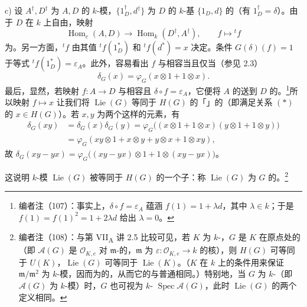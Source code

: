 c) 设 $A^\dagger,D^\dagger$ 为 $A,D$ 的 $k$-模，$\{1_D^\dagger,d^\dagger\}$ 为 $D$ 的 $k$-基 $\{1_D,d\}$ 的（有 $1_D^\dagger=\delta$）。由于 $D$ 在 $k$ 上自由，映射
\[
\operatorname{Hom}_c(A,D)\longrightarrow\operatorname{Hom}_k(D^\dagger,A^\dagger),\qquad f\longmapsto{}^tf
\]
为。另一方面，${}^tf$ 由其值 ${}^tf(1_D^*)$ 和 ${}^tf(d^*)=x$ 决定。条件 $G(\delta)(f)=1$ 于等式 ${}^tf(1_D^*)=\varepsilon_A$。此外，容易看出 $f$ 与相容当且仅当（参见 2.3）
\[
\delta_G(x)=\varphi_G(x\otimes1+1\otimes x).\tag{*}
\]
最后，显然，若映射 $f:A\to D$ 与相容且 $\delta\circ f=\varepsilon_A$，它便将 $A$ 的送到 $D$ 的。\footnote{编者注（107）：事实上，$\delta\circ f=\varepsilon_A$ 蕴涵 $f(1)=1+\lambda d$，其中 $\lambda\in k$；于是 $f(1)=f(1)^2=1+2\lambda d$ 给出 $\lambda=0$。}所以映射 $f\mapsto x$ 让我们将 $\operatorname{Lie}(G)$ 等同于 $H(G)$ 的「」的（即满足关系 $(*)$ 的 $x\in H(G)$）。若 $x,y$ 为两个这样的元素，有
\[
\begin{aligned}
\delta_G(xy)&=\delta_G(x)\delta_G(y)=\varphi_G\bigl((x\otimes1+1\otimes x)(y\otimes1+1\otimes y)\bigr)\\
&=\varphi_G(xy\otimes1+x\otimes y+y\otimes x+1\otimes xy),
\end{aligned}
\]
故 $\delta_G(xy-yx)=\varphi_G\bigl((xy-yx)\otimes1+1\otimes(xy-yx)\bigr)$。

这说明 $k$-模 $\operatorname{Lie}(G)$ 被等同于 $H(G)$ 的一个子：称 $\operatorname{Lie}(G)$ 为 $G$ 的。\footnote{编者注（108）：与第 VII\textsubscript{A} 讲 2.5 比较可见，若 $K$ 为 $k$-，$G$ 是 $K$ 在原点处的（即 $\mathscr A(G)$ 是 $\mathscr O_{K,e}$ 对 $\mathfrak m$-的，$\mathfrak m$ 为 $\varepsilon:\mathscr O_{K,e}\to k$ 的核），则 $H(G)$ 可等同于 $U(K)$，$\operatorname{Lie}(G)$ 可等同于 $\operatorname{Lie}(K)$。（$K$ 在 $k$ 上的条件用来保证 $\mathfrak m/\mathfrak m^2$ 为 $k$-模，因而为的，从而它的与普通相同。）特别地，当 $G$ 为 $k$-（即 $\mathscr A(G)$ 为 $k$-模）时，$G$ 也可视为 $k$- $\operatorname{Spec}\mathscr A(G)$，此时 $\operatorname{Lie}(G)$ 的两个定义相同。}

